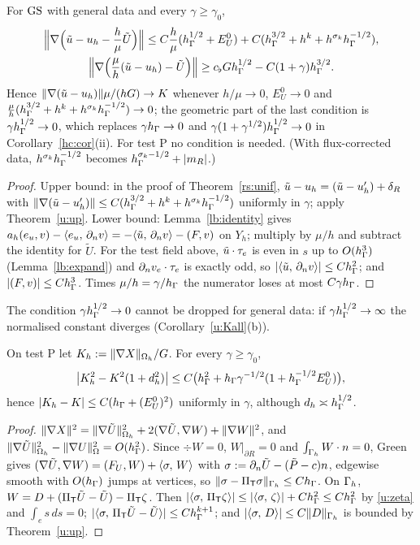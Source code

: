 \begin{corollary}\label{u:gen}
For $\mathrm{GS}$ with general data and every $\gamma\ge\gamma_0$,
\begin{gather*}
\Bigl\|\nabla\Bigl(\tilde u-u_h-\frac h\mu\tilde U\Bigr)\Bigr\|\le C\frac h\mu(h_\Gamma^{1/2}+E^0_U)+C(h_\Gamma^{3/2}+h^k+h^{\sigma_k}h_\Gamma^{-1/2}),\\
\Bigl\|\nabla\Bigl(\frac\mu h(\tilde u-u_h)-\tilde U\Bigr)\Bigr\|\ge c_\flat Gh_\Gamma^{1/2}-C(1+\gamma)h_\Gamma^{3/2}.
\end{gather*}
Hence $\lVert \nabla(\tilde u-u_h)\rVert\mu/(hG)\to K$ whenever $h/\mu\to0$, $E^0_U\to0$ and $\frac\mu h(h_\Gamma^{3/2}+h^k+h^{\sigma_k}h_\Gamma^{-1/2})\to0$; the geometric part of the last condition is $\gamma h_\Gamma^{1/2}\to0$, which replaces $\gamma h_\Gamma\to0$ and $\gamma(1+\gamma^{1/2})h_\Gamma^{1/2}\to0$ in Corollary~\ref{hc:cor}(ii). For test P no condition is needed. (With flux-corrected data, $h^{\sigma_k}h_\Gamma^{-1/2}$ becomes $h_\Gamma^{\sigma_k-1/2}+|m_R|$.)
\end{corollary}

\begin{proof}
Upper bound: in the proof of Theorem~\ref{rs:unif}, $\tilde u-u_h=(\tilde u-u_h')+\delta_R$ with $\lVert \nabla(\tilde u-u_h')\rVert\le C(h_\Gamma^{3/2}+h^k+h^{\sigma_k}h_\Gamma^{-1/2})$ uniformly in $\gamma$; apply Theorem~\ref{u:up}. Lower bound: Lemma~\ref{lb:identity} gives $a_h(e_u,v)-\langle e_u,\, \partial_n v\rangle=-\langle \tilde u,\, \partial_n v\rangle-(F,v)$ on $Y_h$; multiply by $\mu/h$ and subtract the identity for $\tilde U$. For the test field above, $\tilde u\cdot\tau_e$ is even in $s$ up to $O(h_\Gamma^3)$ (Lemma~\ref{lb:expand}) and $\partial_n v_e\cdot\tau_e$ is exactly odd, so $|\langle \tilde u,\, \partial_n v\rangle|\le Ch_\Gamma^2$; and $|(F,v)|\le Ch_\Gamma^3$. Times $\mu/h=\gamma/h_\Gamma$ the numerator loses at most $C\gamma h_\Gamma$.
\end{proof}

The condition $\gamma h_\Gamma^{1/2}\to0$ cannot be dropped for general data: if $\gamma h_\Gamma^{1/2}\to\infty$ the normalised constant diverges (Corollary~\ref{u:Kall}(b)).

\begin{corollary}\label{u:K}
On test P let $K_h:=\lVert \nabla X\rVert_{\Omega_h}/G$. For every $\gamma\ge\gamma_0$,
\[
\bigl|K_h^2-K^2(1+d_h^2)\bigr|\le C\bigl(h_\Gamma^2+h_\Gamma\gamma^{-1/2}(1+h_\Gamma^{-1/2}E^0_U)\bigr),
\]
hence $|K_h-K|\le C(h_\Gamma+(E^0_U)^2)$ uniformly in $\gamma$, although $d_h\asymp h_\Gamma^{1/2}$.
\end{corollary}

\begin{proof}
$\lVert \nabla X\rVert^2=\lVert \nabla\tilde U\rVert^2_{\Omega_h}+2(\nabla\tilde U,\nabla W)+\lVert \nabla W\rVert^2$, and $\lVert \nabla\tilde U\rVert^2_{\Omega_h}-\lVert \nabla U\rVert^2_\Omega=O(h_\Gamma^2)$. Since $\div W=0$, $W|_{\partial R}=0$ and $\int_{\Gamma_h}W\cdot n=0$, Green gives $(\nabla\tilde U,\nabla W)=(F_U,W)+\langle \sigma,\, W\rangle$ with $\sigma:=\partial_n\tilde U-(\tilde P-c)n$, edgewise smooth with $O(h_\Gamma)$ jumps at vertices, so $\lVert \sigma-\Pi_{\mathsf T}\sigma\rVert_{\Gamma_h}\le Ch_\Gamma$. On $\Gamma_h$, $W=D+(\Pi_{\mathsf T}\tilde U-\tilde U)-\Pi_{\mathsf T}\zeta$. Then $|\langle \sigma,\, \Pi_{\mathsf T}\zeta\rangle|\le|\langle \sigma,\, \zeta\rangle|+Ch_\Gamma^2\le Ch_\Gamma^2$ by \eqref{u:zeta} and $\int_es\,ds=0$; $|\langle \sigma,\, \Pi_{\mathsf T}\tilde U-\tilde U\rangle|\le Ch_\Gamma^{k+1}$; and $|\langle \sigma,\, D\rangle|\le C\lVert D\rVert_{\Gamma_h}$ is bounded by Theorem~\ref{u:up}.
\end{proof}

